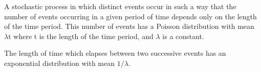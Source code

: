 A stochastic process in which distinct events occur in such a way that 
the number of events occurring in a given period of time depends only 
on the length of the time period. This number of events has a Poisson distribution
with mean $ \lambda \mathrm{t} $ where t is the length of the time period, and 
$ \lambda $ is a constant.
\par
The length of time which elapses between two successive events has an exponential
distribution with mean $ 1/ \lambda . $